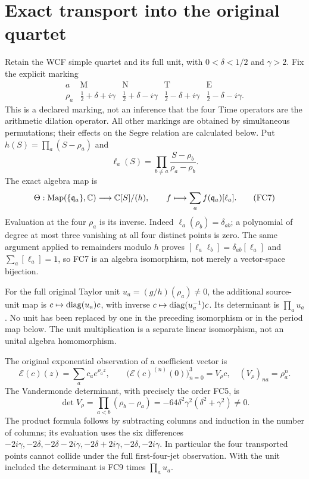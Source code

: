 \section{Exact transport into the original quartet}
Retain the WCF simple quartet and its full unit, with
$0<\delta<1/2$ and $\gamma>2$. Fix the explicit marking
\[
 \begin{array}{c|cccc}
 a&\mathrm M&\mathrm N&\mathrm T&\mathrm E\\\hline
 \rho_a&\frac12+\delta+i\gamma&\frac12+\delta-i\gamma&
 \frac12-\delta+i\gamma&\frac12-\delta-i\gamma.
 \end{array}
 \tag{FC5}
\]
This is a declared marking, not an inference that the four Time operators
are the arithmetic dilation operator. All other markings are obtained
by simultaneous permutations; their effects on the Segre relation are
calculated below. Put $h(S)=\prod_a(S-\rho_a)$ and
\[
 \ell_a(S)=\prod_{b\ne a}\frac{S-\rho_b}{\rho_a-\rho_b}.
 \tag{FC6}
\]
The exact algebra map is
\[
 \Theta:\operatorname{Map}(\{\mathfrak q_a\},\mathbb C)
 \longrightarrow\mathbb C[S]/(h),\qquad
 f\longmapsto\sum_a f(\mathfrak q_a)[\ell_a].
 \tag{FC7}
\]
Evaluation at the four $\rho_a$ is its inverse. Indeed
$\ell_a(\rho_b)=\delta_{ab}$; a polynomial of degree at most three
vanishing at all four distinct points is zero. The same argument applied
to remainders modulo $h$ proves
$[\ell_a\ell_b]=\delta_{ab}[\ell_a]$ and
$\sum_a[\ell_a]=1$, so FC7 is an algebra isomorphism, not merely a
vector-space bijection.

For the full original Taylor unit $u_a=(g/h)(\rho_a)\ne0$, the
additional source-unit map is $c\mapsto\operatorname{diag}(u_a)c$, with inverse
$c\mapsto\operatorname{diag}(u_a^{-1})c$. Its determinant is $\prod_a u_a$.
No unit has been replaced by one in the preceding isomorphism or in
the period map below. The unit multiplication is a separate linear
isomorphism, not an unital algebra homomorphism.

The original exponential observation of a coefficient vector is
\[
 \mathcal E(c)(z)=\sum_a c_a e^{\rho_a z},\qquad
 \bigl(\mathcal E(c)^{(n)}(0)\bigr)_{n=0}^3
 =V_\rho c,\quad (V_\rho)_{na}=\rho_a^n.
 \tag{FC8}
\]
The Vandermonde determinant, with precisely the order FC5, is
\[
 \det V_\rho=\prod_{a<b}(\rho_b-\rho_a)
 =-64\delta^2\gamma^2(\delta^2+\gamma^2)\ne0.
 \tag{FC9}
\]
The product formula follows by subtracting columns and induction in the
number of columns; its evaluation uses the six differences
$-2i\gamma,-2\delta,-2\delta-2i\gamma,
-2\delta+2i\gamma,-2\delta,-2i\gamma$.
In particular the four transported points cannot collide under the full
first-four-jet observation. With the unit included the determinant is
FC9 times $\prod_a u_a$.

